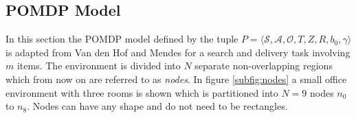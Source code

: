 \subsection{POMDP Model}\label{subsec:POMDPmodel}
In this section the POMDP model defined by the tuple $P = \langle \mathcal{S}, \mathcal{A}, \mathcal{O}, T, Z, R, b_0, \gamma \rangle$ is adapted from Van den Hof \cite{Vandenhof} and Mendes \cite{Mendes11} for a search and delivery task involving $m$ items. The environment is divided into $N$ separate non-overlapping regions which from now on are referred to as \textit{nodes}. In figure \ref{subfig:nodes} a small office environment with three rooms is shown which is partitioned into $N=9$ nodes $n_0$ to $n_8$. Nodes can have any shape and do not need to be rectangles.
